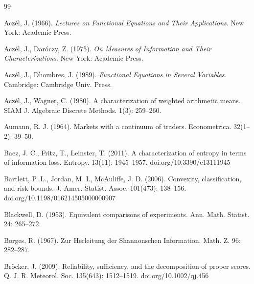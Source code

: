 \documentclass{article}
\theoremstyle{plain}
\theoremstyle{definition}
\begin{document}
\begin{thebibliography}{99}

Acz\'el, J. (1966). \emph{Lectures on Functional Equations and Their
Applications}. New York: Academic Press.

Acz\'el, J., Dar\'oczy, Z. (1975). \emph{On Measures of Information and Their
Characterizations}. New York: Academic Press.

Acz\'el, J., Dhombres, J. (1989). \emph{Functional Equations in Several
Variables}. Cambridge: Cambridge Univ. Press.

Acz\'el, J., Wagner, C. (1980). A characterization of weighted arithmetic
means. SIAM J. Algebraic Discrete Methods. 1(3): 259--260.

Aumann, R. J. (1964). Markets with a continuum of traders. Econometrica.
32(1--2): 39--50.

Baez, J. C., Fritz, T., Leinster, T. (2011). A characterization of entropy in
terms of information loss. Entropy. 13(11): 1945--1957.
doi.org/10.3390/e13111945

Bartlett, P. L., Jordan, M. I., McAuliffe, J. D. (2006). Convexity,
classification, and risk bounds. J. Amer. Statist. Assoc. 101(473): 138--156.
doi.org/10.1198/016214505000000907

Blackwell, D. (1953). Equivalent comparisons of experiments. Ann. Math.
Statist. 24: 265--272.

Borges, R. (1967). Zur Herleitung der Shannonschen Information. Math. Z. 96:
282--287.

Br\"ocker, J. (2009). Reliability, sufficiency, and the decomposition of
proper scores. Q. J. R. Meteorol. Soc. 135(643): 1512--1519.
doi.org/10.1002/qj.456


\end{thebibliography}
\end{document}
